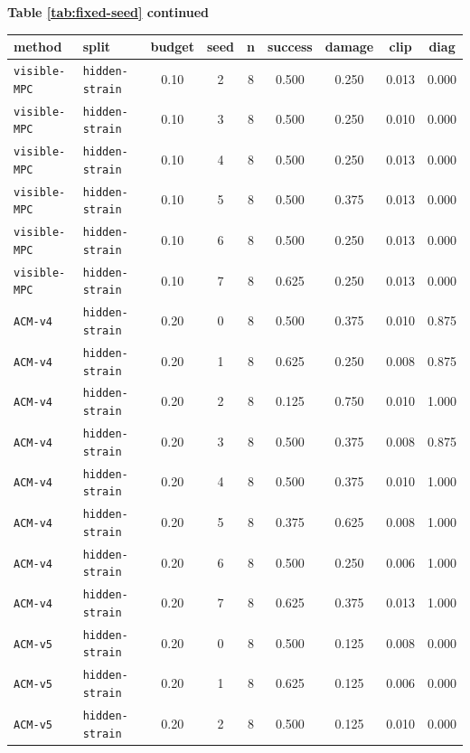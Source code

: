\documentclass{article}
\begin{document}
\begin{center}
\textbf{Table \ref{tab:fixed-seed} continued}\\[0.4ex]
\begin{tabular}{llccccccc}
\toprule
method & split & budget & seed & n & success & damage & clip & diag \\
\midrule
\texttt{visible-MPC} & \texttt{hidden-strain} & 0.10 & 2 & 8 & 0.500 & 0.250 & 0.013 & 0.000 \\
\texttt{visible-MPC} & \texttt{hidden-strain} & 0.10 & 3 & 8 & 0.500 & 0.250 & 0.010 & 0.000 \\
\texttt{visible-MPC} & \texttt{hidden-strain} & 0.10 & 4 & 8 & 0.500 & 0.250 & 0.013 & 0.000 \\
\texttt{visible-MPC} & \texttt{hidden-strain} & 0.10 & 5 & 8 & 0.500 & 0.375 & 0.013 & 0.000 \\
\texttt{visible-MPC} & \texttt{hidden-strain} & 0.10 & 6 & 8 & 0.500 & 0.250 & 0.013 & 0.000 \\
\texttt{visible-MPC} & \texttt{hidden-strain} & 0.10 & 7 & 8 & 0.625 & 0.250 & 0.013 & 0.000 \\
\texttt{ACM-v4} & \texttt{hidden-strain} & 0.20 & 0 & 8 & 0.500 & 0.375 & 0.010 & 0.875 \\
\texttt{ACM-v4} & \texttt{hidden-strain} & 0.20 & 1 & 8 & 0.625 & 0.250 & 0.008 & 0.875 \\
\texttt{ACM-v4} & \texttt{hidden-strain} & 0.20 & 2 & 8 & 0.125 & 0.750 & 0.010 & 1.000 \\
\texttt{ACM-v4} & \texttt{hidden-strain} & 0.20 & 3 & 8 & 0.500 & 0.375 & 0.008 & 0.875 \\
\texttt{ACM-v4} & \texttt{hidden-strain} & 0.20 & 4 & 8 & 0.500 & 0.375 & 0.010 & 1.000 \\
\texttt{ACM-v4} & \texttt{hidden-strain} & 0.20 & 5 & 8 & 0.375 & 0.625 & 0.008 & 1.000 \\
\texttt{ACM-v4} & \texttt{hidden-strain} & 0.20 & 6 & 8 & 0.500 & 0.250 & 0.006 & 1.000 \\
\texttt{ACM-v4} & \texttt{hidden-strain} & 0.20 & 7 & 8 & 0.625 & 0.375 & 0.013 & 1.000 \\
\texttt{ACM-v5} & \texttt{hidden-strain} & 0.20 & 0 & 8 & 0.500 & 0.125 & 0.008 & 0.000 \\
\texttt{ACM-v5} & \texttt{hidden-strain} & 0.20 & 1 & 8 & 0.625 & 0.125 & 0.006 & 0.000 \\
\texttt{ACM-v5} & \texttt{hidden-strain} & 0.20 & 2 & 8 & 0.500 & 0.125 & 0.010 & 0.000 \\

\end{tabular}
\end{center}
\end{document}
